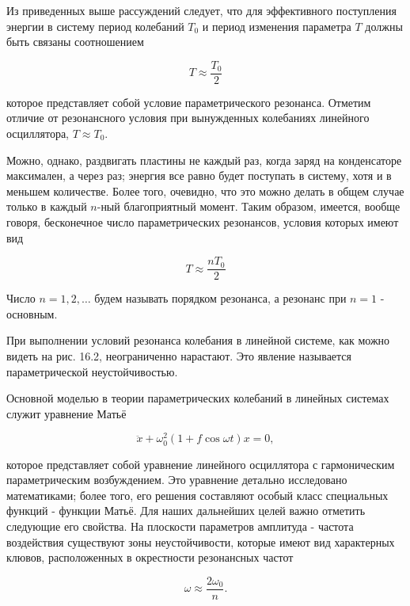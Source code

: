 \documentclass[10pt]{article}
\begin{document}
Из приведенных выше рассуждений следует, что для эффективного поступления энергии в систему период колебаний $T_{0}$ и период изменения параметра $T$ должны быть связаны соотношением


\begin{equation*}
T \approx \frac{T_{0}}{2} \tag{16.4}
\end{equation*}


которое представляет собой условие параметрического резонанса. Отметим отличие от резонансного условия при вынужденных колебаниях линейного осциллятора, $T \approx T_{0}$.

Можно, однако, раздвигать пластины не каждый раз, когда заряд на конденсаторе максимален, а через раз; энергия все равно будет поступать в систему, хотя и в меньшем количестве. Более того, очевидно, что это можно делать в общем случае только в каждый $n$-ный благоприятный момент. Таким образом, имеется, вообще говоря, бесконечное число параметрических резонансов, условия которых имеют вид


\begin{equation*}
T \approx \frac{n T_{0}}{2} \tag{16.4}
\end{equation*}


Число $n=1,2, \ldots$ будем называть порядком резонанса, а резонанс при $n=1$ - основным.

При выполнении условий резонанса колебания в линейной системе, как можно видеть на рис. 16.2, неограниченно нарастают. Это явление называется параметрической неустойчивостью.

Основной моделью в теории параметрических колебаний в линейных системах служит уравнение Матьё


\begin{equation*}
\ddot{x}+\omega_{0}^{2}(1+f \cos \omega t) x=0, \tag{16.5}
\end{equation*}


которое представляет собой уравнение линейного осциллятора с гармоническим параметрическим возбуждением. Это уравнение детально исследовано математиками; более того, его решения составляют особый класс специальных функций - функции Матьё. Для наших дальнейших целей важно отметить следующие его свойства. На плоскости параметров амплитуда - частота воздействия существуют зоны неустойчивости, которые имеют вид характерных клювов, расположенных в окрестности резонансных частот


\begin{equation*}
\omega \approx \frac{2 \omega_{0}}{n} . \tag{16.6}
\end{equation*}
\end{document}
